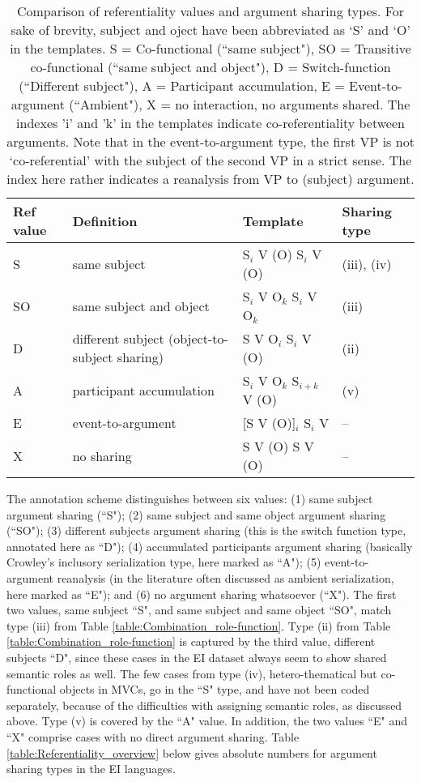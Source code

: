 \begin{table}


\begin{tabular}{l p{4cm} l l}
\hline \hline
Ref value & Definition & Template & Sharing type \\ 
\hline 
S & same subject & S$_i$ V (O) S$_i$ V (O) &  (iii), (iv) \\ 
SO & same subject and object & S$_i$ V O$_k$ S$_i$ V O$_k$ & (iii) \\ 
D & different subject (object-to-subject sharing) & S V O$_i$ S$_i$ V (O) & (ii) \\ 
A & participant accumulation & S$_i$ V O$_k$ S$_{i+k}$ V (O) & (v) \\  
E & event-to-argument & [S V (O)]$_i$ S$_i$ V & -- \\ 
X & no sharing & S V (O) S V (O) & -- \\ 
\hline 
\end{tabular} 
\caption[Comparison of referentiality and argument sharing types]{Comparison of referentiality values and argument sharing types. For sake of brevity, subject and oject have been abbreviated as `S' and `O' in the templates. S = Co-functional (``same subject"), SO = Transitive co-functional (``same subject and object"), D = Switch-function (``Different subject"), A = Participant accumulation, E = Event-to-argument (``Ambient"), X = no interaction, no arguments shared. The indexes 'i' and 'k' in the templates indicate co-referentiality between arguments. Note that in the event-to-argument type, the first VP is not `co-referential' with the subject of the second VP in a strict sense. The index here rather indicates a reanalysis from VP to (subject) argument.}
\label{table:comparison_ref-sharing}


\end{table}


The annotation scheme distinguishes between six values: (1) same subject argument sharing (``S"); (2) same subject and same object argument sharing (``SO"); (3) different subjects argument sharing (this is the switch function type, annotated here as ``D"); (4) accumulated participants argument sharing (basically Crowley's inclusory serialization type, here marked as ``A"); (5) event-to-argument reanalysis (in the literature often discussed as ambient serialization, here marked as ``E"); and (6) no argument sharing whatsoever (``X"). The first two values, same subject ``S", and same subject and same object ``SO", match type (iii) from Table \ref{table:Combination_role-function}. Type (ii) from Table \ref{table:Combination_role-function} is captured by the third value, different subjects ``D", since these cases in the EI dataset always seem to show shared semantic roles as well. The few cases from type (iv), hetero-thematical but co-functional objects in MVCs, go in the ``S" type, and have not been coded separately, because of the difficulties with assigning semantic roles, as discussed above. Type (v) is covered by the ``A" value. In addition, the two values ``E" and ``X" comprise cases with no direct argument sharing. Table \ref{table:Referentiality_overview} below gives absolute numbers  for argument sharing types in the EI languages.

